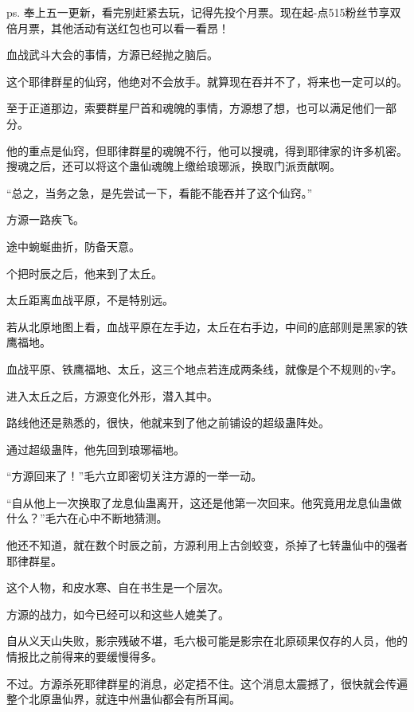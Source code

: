
\begin{this_body}



ps. 奉上五一更新，看完别赶紧去玩，记得先投个月票。现在起-点515粉丝节享双倍月票，其他活动有送红包也可以看一看昂！

血战武斗大会的事情，方源已经抛之脑后。

这个耶律群星的仙窍，他绝对不会放手。就算现在吞并不了，将来也一定可以的。

至于正道那边，索要群星尸首和魂魄的事情，方源想了想，也可以满足他们一部分。

他的重点是仙窍，但耶律群星的魂魄不行，他可以搜魂，得到耶律家的许多机密。搜魂之后，还可以将这个蛊仙魂魄上缴给琅琊派，换取门派贡献啊。

“总之，当务之急，是先尝试一下，看能不能吞并了这个仙窍。”

方源一路疾飞。

途中蜿蜒曲折，防备天意。

个把时辰之后，他来到了太丘。

太丘距离血战平原，不是特别远。

若从北原地图上看，血战平原在左手边，太丘在右手边，中间的底部则是黑家的铁鹰福地。

血战平原、铁鹰福地、太丘，这三个地点若连成两条线，就像是个不规则的v字。

进入太丘之后，方源变化外形，潜入其中。

路线他还是熟悉的，很快，他就来到了他之前铺设的超级蛊阵处。

通过超级蛊阵，他先回到琅琊福地。

“方源回来了！”毛六立即密切关注方源的一举一动。

“自从他上一次换取了龙息仙蛊离开，这还是他第一次回来。他究竟用龙息仙蛊做什么？”毛六在心中不断地猜测。

他还不知道，就在数个时辰之前，方源利用上古剑蛟变，杀掉了七转蛊仙中的强者耶律群星。

这个人物，和皮水寒、自在书生是一个层次。

方源的战力，如今已经可以和这些人媲美了。

自从义天山失败，影宗残破不堪，毛六极可能是影宗在北原硕果仅存的人员，他的情报比之前得来的要缓慢得多。

不过。方源杀死耶律群星的消息，必定捂不住。这个消息太震撼了，很快就会传遍整个北原蛊仙界，就连中州蛊仙都会有所耳闻。


\end{this_body}
